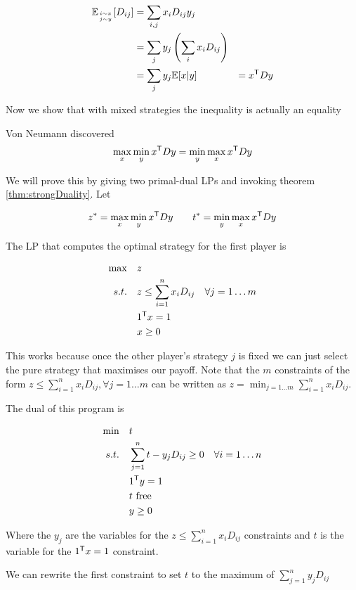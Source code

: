 \begin{align*}
\mathbb{E}_{{i\sim x}\atop {j\sim y}} [D_{ij}] &= \sum_{i,j} x_i D_{ij}y_j\\
	&=\sum_j y_j \left(\sum_i x_iD_{ij}\right)\\
	&=\sum_j y_j \mathbb{E}[x|y]
	&={x}^\text{\upshape \sffamily T} D y
\end{align*}

Now we show that with mixed strategies the inequality is actually an equality

\begin{thm} Von Neumann discovered
\[\max_x\min_y {x}^\text{\upshape \sffamily T}Dy = \min_y\max_x {x}^\text{\upshape \sffamily T} Dy\]
\end{thm}

\begin{pr} We will prove this by giving two primal-dual LPs and invoking theorem \ref{thm:strongDuality}. Let

\[z^* = \max_x \min_y {x}^\text{\upshape \sffamily T} Dy \qquad t^*= \min_y\max_x {x}^\text{\upshape \sffamily T} D y\]

The LP that computes the optimal strategy for the first player is

\begin{align*}
\max \quad & z\\
s.t.\quad & z \leq \sum_{i=1}^n x_i D_{ij} & \forall j=1\ldots m\\
&{1}^\text{\upshape \sffamily T} x = 1\\
&x\geq 0
\end{align*}

This works because once the other player's strategy $j$ is fixed we can just select the pure strategy that maximises our payoff. Note that the $m$ constraints of the form $z \leq \sum_{i=1}^n x_i D_{ij}, \forall j=1 \ldots m$ can be written as $z=\min_{j=1\ldots m} \sum_{i=1}^n x_i D_{ij}$.

The dual of this program is

\begin{align*}
\min \quad & t \\
s.t.\quad & \sum_{j=1}^n t-y_jD_{ij}  \geq 0 & \forall i=1\ldots n\\
& {1}^\text{\upshape \sffamily T} y = 1\\
&t \text{ free}\\
&y\geq 0
\end{align*}

Where the $y_j$ are the variables for the $z \leq \sum_{i=1}^n x_i D_{ij}$ constraints and $t$ is the variable for the ${1}^\text{\upshape \sffamily T} x=1$ constraint. 

We can rewrite the first constraint to set $t$ to the maximum of $\sum_{j=1}^n y_jD_{ij}$


\end{pr}
